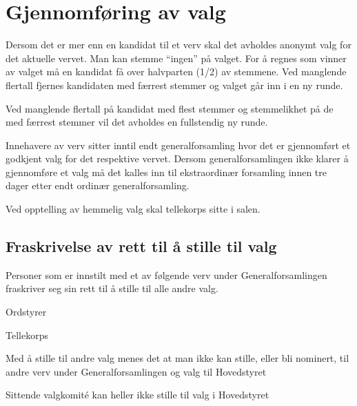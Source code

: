 \section{Gjennomføring av valg}{
\vspace{23pt}
Dersom det er mer enn en kandidat til et verv skal det avholdes anonymt valg for det aktuelle vervet. Man kan stemme “ingen” på valget. For å regnes som vinner av valget må en kandidat få over halvparten (1/2) av stemmene. Ved manglende flertall fjernes kandidaten med færrest stemmer og valget går inn i en ny runde.\newline
					
Ved manglende flertall på kandidat med flest stemmer og stemmelikhet på de med færrest stemmer vil det avholdes en fullstendig ny runde.\newline

Innehavere av verv sitter inntil endt generalforsamling hvor det er gjennomført et godkjent valg for det respektive vervet. Dersom generalforsamlingen ikke klarer å gjennomføre et valg må det kalles inn til ekstraordinær forsamling innen tre dager etter endt ordinær generalforsamling.\newline

Ved opptelling av hemmelig valg skal tellekorps sitte i salen.


	\subsection{Fraskrivelse av rett til å stille til valg} {
	Personer som er innstilt med et av følgende verv under Generalforsamlingen fraskriver seg sin rett til å stille til alle andre valg.
	\begin{liste}
		\item Ordstyrer
		\item Tellekorps
	\end{liste}
	Med å stille til andre valg menes det at man ikke kan stille, eller bli nominert, til andre verv under Generalforsamlingen og valg til Hovedstyret \newline

    Sittende valgkomité kan heller ikke stille til valg i Hovedstyret

	}
}
